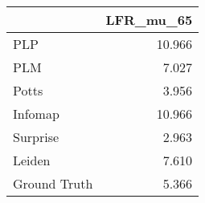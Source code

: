 \begin{tabular}{lr}
\toprule
{} & LFR_mu_65 \\
\midrule
PLP          &    10.966 \\
PLM          &     7.027 \\
Potts        &     3.956 \\
Infomap      &    10.966 \\
Surprise     &     2.963 \\
Leiden       &     7.610 \\
Ground Truth &     5.366 \\
\bottomrule
\end{tabular}

